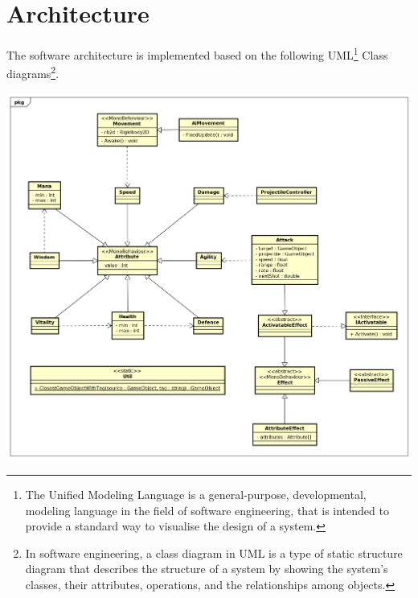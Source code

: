 \documentclass[11pt]{article}
\begin{document}
\section{Architecture}
The software architecture is implemented based on the following UML\footnote{The Unified Modeling Language is a general-purpose, developmental, modeling language in the field of software engineering, that is intended to provide a standard way to visualise the design of a system.} Class diagrams\footnote{In software engineering, a class diagram in UML is a type of static structure diagram that describes the structure of a system by showing the system's classes, their attributes, operations, and the relationships among objects.}.
\begin{center}
 \includegraphics[width=\textwidth]{./interaction.png}
\end{center}
\end{document}

